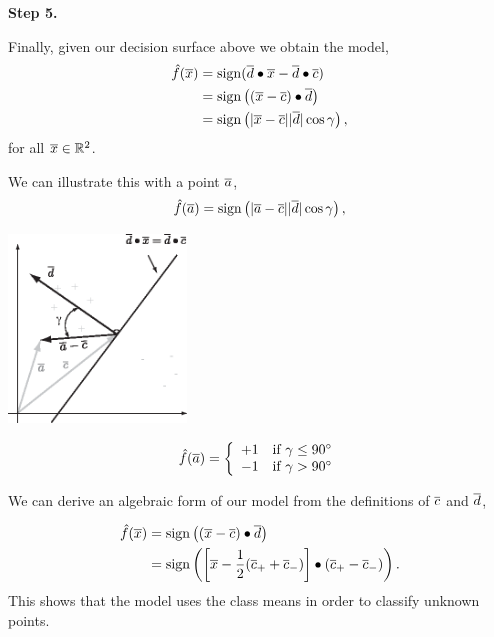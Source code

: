 \documentclass[a4paper,blends,pdf,colorBG,slideColor]{prosper}
\begin{document}

{\bf Step 5.}


Finally, given our decision surface above we obtain the model,
\begin{align*}
\model{f}(\ol{x}) &= \sign(\ol{d}\bullet\ol{x} - \ol{d}\bullet\ol{c})\\
	& = \sign\left ((\ol{x} - \ol{c})\bullet\ol{d}\right )\\
	& = \sign\left (\abs{\ol{x} - \ol{c}}\abs{\ol{d}}\cos \gamma\right ),
\end{align*}
for all $\overline{x} \in \mathbb{R}^{2}$.
\es


We can illustrate this with a point $\overline{a}$,
\begin{equation*}
\model{f}(\ol{a}) = \sign\left (\abs{\ol{a} - \ol{c}}\abs{\ol{d}}\cos \gamma\right ),
\end{equation*}

\begin{minipage}{2in}
\includegraphics[height=50mm]{figures/fig04-04.eps}
\end{minipage}
\begin{minipage}{2in}
\begin{equation*}
\hat{f}(\overline{a}) = \left\{
\begin{array}{ll}
+1 & \mbox{if $\gamma \le 90^\circ$}\\
-1 & \mbox{if $\gamma > 90^\circ$}
\end{array}
\right.
\end{equation*}
\end{minipage}

\es


We can derive an
algebraic form of our model from the definitions of $\overline{c}$ and $\overline{d}$,

\begin{align*}
\model{f}(\ol{x}) & = \sign \left ((\ol{x} - \ol{c})\bullet\ol{d}\right)\nonumber\\
	& = \sign \left ( \left [\ol{x} - \frac{1}{2}(\ol{c}_+ +\ol{c}_- ) \right ]\bullet(\ol{c}_+ - \ol{c}_-)\right).
\end{align*}
This shows that the model uses the class means in order to classify unknown points.
\es
\end{document}

